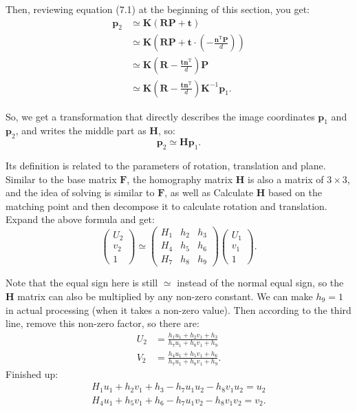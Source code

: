 Then, reviewing equation (7.1) at the beginning of this section, you get:
\begin{align*}
\bm{p}_2 &\simeq \bm{K} ( \bm{R} \bm{P} + \bm{t} ) \\
&\simeq \bm{K} \left( \bm{R} \bm{P} + \bm{t} \cdot (- \frac{\bm{n}^\mathrm{T} \bm{P} }{d}) \right) \\
&\simeq \bm{K} \left( \bm{R} - \frac{\bm{t} \bm{n}^\mathrm{T} }{d} \right) \bm{P} \\
&\simeq \bm{K} \left( \bm{R} - \frac{\bm{t} \bm{n}^\mathrm{T} }{d} \right) \bm{K}^{ -1} \bm{p}_1.
\end{align*}

So, we get a transformation that directly describes the image coordinates $\bm{p}_1$ and $\bm{p}_2$, and writes the middle part as $\bm{H}$, so:
\begin{equation}
\bm{p}_2 \simeq \bm{H} \bm{p}_1.
\end{equation}

Its definition is related to the parameters of rotation, translation and plane. Similar to the base matrix $\bm{F}$, the homography matrix $\bm{H}$ is also a matrix of $3 \times 3$, and the idea of ​​solving is similar to $\bm{F}$, as well as Calculate $\bm{H}$ based on the matching point and then decompose it to calculate rotation and translation. Expand the above formula and get:
\begin{equation}
\begin{pmatrix}
U_{2}\\v_{2}\\1
\end{pmatrix}
\simeq
\begin{pmatrix}
 H_{1} & h_{2} & h_{3}\\
 H_{4} & h_{5} & h_{6}\\
 H_{7} & h_{8} & h_{9}
\end{pmatrix}
\begin{pmatrix}
U_{1}\\v_{1}\\1
\end{pmatrix}.
\end{equation}

Note that the equal sign here is still $\simeq$ instead of the normal equal sign, so the $\bm{H}$ matrix can also be multiplied by any non-zero constant. We can make $h_9 = 1$ in actual processing (when it takes a non-zero value). Then according to the third line, remove this non-zero factor, so there are:
\[
\begin{aligned}
U_{2}&=\frac{h_{1}u_{1}+h_{2}v_{1}+h_{3}}{h_{7}u_{1}+h_{8}v_{1} +h_{9}}\\
V_{2}&=\frac{h_{4}u_{1}+h_{5}v_{1}+h_{6}}{h_{7}u_{1}+h_{8}v_{1} +h_{9}}.
\end{aligned}
\]
Finished up:
\[
\begin{gathered}
H_{1}u_{1}+h_{2}v_{1}+h_{3}-h_{7}u_{1}u_{2}-h_{8}v_{1}u_{2}=u_ {2}\\
H_{4}u_{1}+h_{5}v_{1}+h_{6}-h_{7}u_{1}v_{2}-h_{8}v_{1}v_{2}=v_ {2}.
\end{gathered}
\]

